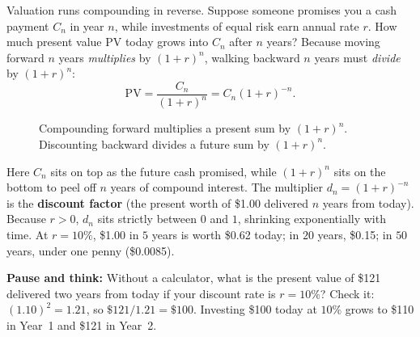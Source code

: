 Valuation runs compounding in reverse. Suppose someone promises you a cash payment $C_n$ in year $n$, while investments of equal risk earn annual rate $r$. How much present value $\text{PV}$ today grows into $C_n$ after $n$ years? Because moving forward $n$ years \emph{multiplies} by $(1+r)^n$, walking backward $n$ years must \emph{divide} by $(1+r)^n$:
\[
 \text{PV} = \frac{C_n}{(1+r)^n} = C_n(1+r)^{-n}.
\]

\begin{figure}[htbp]
\centering
{}
\caption{Compounding forward multiplies a present sum by $(1+r)^n$. Discounting backward divides a future sum by $(1+r)^n$.}
\label{fig:ch03-compound-discount}
\end{figure}

Here $C_n$ sits on top as the future cash promised, while $(1+r)^n$ sits on the bottom to peel off $n$ years of compound interest. The multiplier $d_n = (1+r)^{-n}$ is the \textbf{discount factor} (the present worth of \$1.00 delivered $n$ years from today). Because $r > 0$, $d_n$ sits strictly between $0$ and $1$, shrinking exponentially with time. At $r = 10\%$, \$1.00 in $5$ years is worth \$0.62 today; in $20$ years, \$0.15; in $50$ years, under one penny (\$0.0085).

\begin{recoverybox}
\textbf{Pause and think:} Without a calculator, what is the present value of \$121 delivered two years from today if your discount rate is $r = 10\%$? Check it: $(1.10)^2 = 1.21$, so $\$121 / 1.21 = \$100$. Investing \$100 today at $10\%$ grows to \$110 in Year~1 and \$121 in Year~2.
\end{recoverybox}

